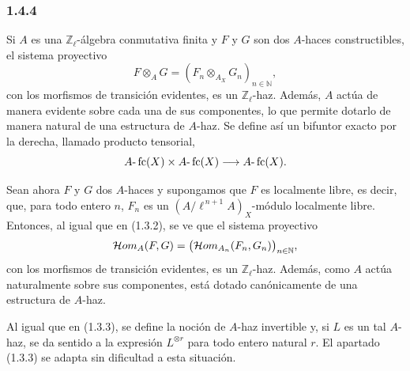 \subsubsection*{1.4.4}
Si \(A\) es una \(\mathbb Z_\ell\)-álgebra conmutativa finita y \(F\) y \(G\) son dos \(A\)-haces constructibles, el sistema proyectivo
\[
F\otimes_A G=(F_n\otimes_{A_X} G_n)_{n\in\mathbb N},
\]
con los morfismos de transición evidentes, es un \(\mathbb Z_\ell\)-haz. Además, \(A\) actúa de manera evidente sobre cada una de sus componentes, lo que permite dotarlo de manera natural de una estructura de \(A\)-haz. Se define así un bifuntor exacto por la derecha, llamado producto tensorial,
\[
A\text{-}\operatorname{fc}(X)\times A\text{-}\operatorname{fc}(X)\longrightarrow A\text{-}\operatorname{fc}(X).
\]

Sean ahora \(F\) y \(G\) dos \(A\)-haces y supongamos que \(F\) es localmente libre, es decir, que, para todo entero \(n\), \(F_n\) es un \((A/\ell^{\,n+1}A)_X\)-módulo localmente libre. Entonces, al igual que en (1.3.2), se ve que el sistema proyectivo
\[
\mathcal{H}om_A(F,G)=\bigl(\mathcal{H}om_{A_n}(F_n,G_n)\bigr)_{n\in\mathbb N},
\]
con los morfismos de transición evidentes, es un \(\mathbb Z_\ell\)-haz. Además, como \(A\) actúa naturalmente sobre sus componentes, está dotado canónicamente de una estructura de \(A\)-haz.

Al igual que en (1.3.3), se define la noción de \(A\)-haz invertible y, si \(L\) es un tal \(A\)-haz, se da sentido a la expresión \(L^{\otimes r}\) para todo entero natural \(r\). El apartado (1.3.3) se adapta sin dificultad a esta situación.
